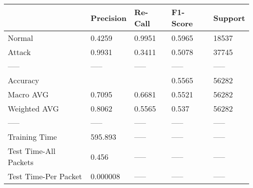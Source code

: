\begin{tabular}{lllll}
\toprule
{} & Precision & Re-Call & F1-Score & Support \\
\midrule
Normal                &    0.4259 &  0.9951 &   0.5965 &   18537 \\
Attack                &    0.9931 &  0.3411 &   0.5078 &   37745 \\
-----                 &     ----- &   ----- &    ----- &   ----- \\
Accuracy              &           &         &   0.5565 &   56282 \\
Macro AVG             &    0.7095 &  0.6681 &   0.5521 &   56282 \\
Weighted AVG          &    0.8062 &  0.5565 &    0.537 &   56282 \\
-----                 &     ----- &   ----- &    ----- &   ----- \\
Training Time         &   595.893 &   ----- &    ----- &   ----- \\
Test Time-All Packets &     0.456 &   ----- &    ----- &   ----- \\
Test Time-Per Packet  &  0.000008 &   ----- &    ----- &   ----- \\
\bottomrule
\end{tabular}
